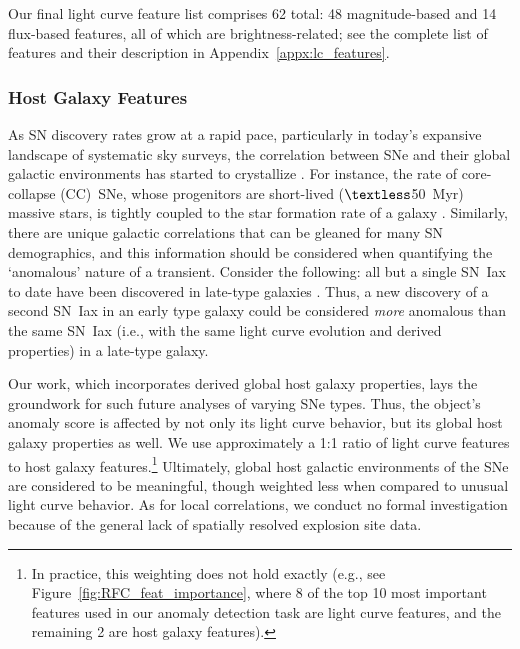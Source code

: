 \documentclass[twocolumn]{aastex63}
\begin{document}
Our final light curve feature list comprises 62 total: 48 magnitude-based and 14 flux-based features, all of which are brightness-related; see the complete list of features and their description in Appendix~\ref{appx:lc_features}.

\subsubsection{Host Galaxy Features} \label{subsubsec:host_features}

As SN discovery rates grow at a rapid pace, particularly in today's expansive landscape of systematic sky surveys, the correlation between SNe and their global galactic environments has started to crystallize \citep[e.g.,][and references therein]{Li2011, Qin2022}. For instance, the rate of core-collapse (CC)~SNe, whose progenitors are short-lived ($\textless$50~Myr) massive stars, is tightly coupled to the star formation rate of a galaxy \citep{Graur2017}. Similarly, there are unique galactic correlations that can be gleaned for many SN demographics, and this information should be considered when quantifying the `anomalous' nature of a transient. Consider the following: all but a single SN~Iax to date have been discovered in late-type galaxies \citep{Lyman2018}. Thus, a new discovery of a second SN~Iax in an early type galaxy could be considered \emph{more} anomalous than the same SN~Iax (i.e., with the same light curve evolution and derived properties) in a late-type galaxy. \par

Our work, which incorporates derived global host galaxy properties, lays the groundwork for such future analyses of varying SNe types. Thus, the object's anomaly score is affected by not only its light curve behavior, but its global host galaxy properties as well. We use approximately a 1:1 ratio of light curve features to host galaxy features.\footnote{In practice, this weighting does not hold exactly (e.g., see Figure~\ref{fig:RFC_feat_importance}, where 8 of the top 10 most important features used in our anomaly detection task are light curve features, and the remaining 2 are host galaxy features).} Ultimately, global host galactic environments of the SNe are considered to be meaningful, though weighted less when compared to unusual light curve behavior. As for local correlations, we conduct no formal investigation because of the general lack of spatially resolved explosion site data. %
\end{document}
